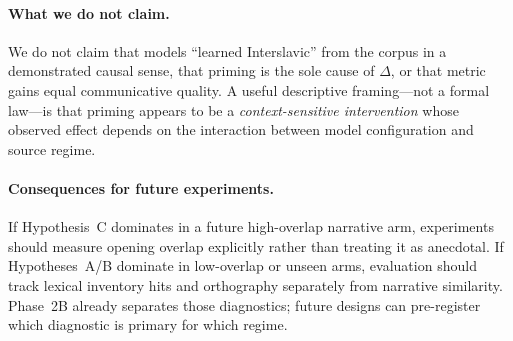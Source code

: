 \paragraph{What we do not claim.}
We do not claim that models ``learned Interslavic'' from the corpus in a demonstrated causal sense, that priming is the sole cause of $\Delta$, or that metric gains equal communicative quality.
A useful descriptive framing---not a formal law---is that priming appears to be a \emph{context-sensitive intervention} whose observed effect depends on the interaction between model configuration and source regime.

\paragraph{Consequences for future experiments.}
If Hypothesis~C dominates in a future high-overlap narrative arm, experiments should measure opening overlap explicitly rather than treating it as anecdotal.
If Hypotheses~A/B dominate in low-overlap or unseen arms, evaluation should track lexical inventory hits and orthography separately from narrative similarity.
Phase~2B already separates those diagnostics; future designs can pre-register which diagnostic is primary for which regime.
